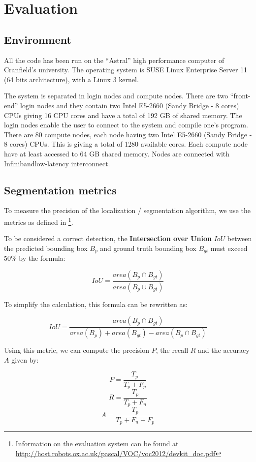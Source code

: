 \chapter{Evaluation}

\section{Environment}

All the code has been run on the \enquote{Astral} high performance computer of Cranfield's university. The operating system is SUSE Linux Enterprise Server 11 (64 bits architecture), with a Linux 3 kernel.

The system is separated in login nodes and compute nodes. There are two \enquote{front-end} login nodes and they contain two Intel E5-2660 (Sandy Bridge - 8 cores) CPUs giving 16 CPU cores and have a total of 192 GB of shared memory. The login nodes enable the user to connect to the system and compile one's program. There are 80 compute nodes, each node having two Intel E5-2660 (Sandy Bridge - 8 cores) CPUs. This is giving a total of 1280 available cores. Each compute node have at least accessed to 64 GB shared memory. Nodes are connected with Infiniband\TM low-latency interconnect.

\section{Segmentation metrics}

To measure the precision of the localization / segmentation algorithm, we use the metrics as defined in \cite{pascalVoc2012} \footnote{Information on the evaluation system can be found at  \url{http://host.robots.ox.ac.uk/pascal/VOC/voc2012/devkit_doc.pdf}}.

To be considered a correct detection, the \textbf{Intersection over Union} $IoU$ between the predicted bounding box $B_p$ and ground truth bounding box $B_{gt}$ must exceed 50\% by the formula:

$$IoU = \frac{area(B_p \cap B_{gt})}{area(B_p \cup B_{gt})}$$

To simplify the calculation, this formula can be rewritten as:

$$IoU = \frac{area(B_p \cap B_{gt})}{area(B_p) + area(B_{gt}) - area(B_p \cap B_{gt})} $$

Using this metric, we can compute the precision $P$, the recall $R$ and the accuracy $A$ given by:

$$ P =  \frac{T_p}{T_p + F_p}$$
$$ R =  \frac{T_p}{T_p + F_n}$$
$$ A = \frac{T_p}{T_p + F_n + F_p} $$

